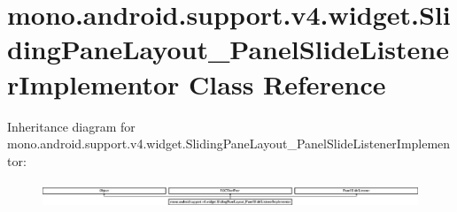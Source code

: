 \hypertarget{classmono_1_1android_1_1support_1_1v4_1_1widget_1_1_sliding_pane_layout___panel_slide_listener_implementor}{}\section{mono.\+android.\+support.\+v4.\+widget.\+Sliding\+Pane\+Layout\+\_\+\+Panel\+Slide\+Listener\+Implementor Class Reference}
\label{classmono_1_1android_1_1support_1_1v4_1_1widget_1_1_sliding_pane_layout___panel_slide_listener_implementor}
Inheritance diagram for mono.\+android.\+support.\+v4.\+widget.\+Sliding\+Pane\+Layout\+\_\+\+Panel\+Slide\+Listener\+Implementor\+:\begin{figure}[H]
\begin{center}
\leavevmode
\includegraphics[height=0.763463cm]{classmono_1_1android_1_1support_1_1v4_1_1widget_1_1_sliding_pane_layout___panel_slide_listener_implementor}
\end{center}
\end{figure}
